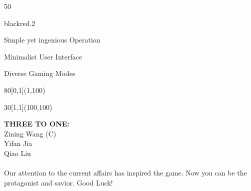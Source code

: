 \documentclass[hyperref={pdfpagelabels=false}]{beamer}
\begin{document}
\begin{frame}
\begin{textblock}{50}
\begin{transparentbox}{black}{red}{.2}
\begin{itemize}
{				\item Simple yet ingenious Operation

				\item Minimalist User Interface

				\item  Diverse Gaming Modes}
\end{itemize}       	 

		\end{transparentbox}
	\end{textblock} 

	\begin{textblock}{80}[0,1](1,100)
		\logos[light]
	\end{textblock}

	\begin{textblock}{30}[1,1](100,100)
		\begin{blankbox}
			\huge\textbf{{THREE TO ONE:}} \\
			\Large{Zining Wang (C)}\\ 
			Yifan Jia  \\
			Qiao Liu \\\hspace*{\fill} \\
			Our attention to the current affairs has inspired the game. Now you can be the protagonist and savior. Good Luck!
			
		\end{blankbox}
	\end{textblock}


\end{frame}
\end{document}

